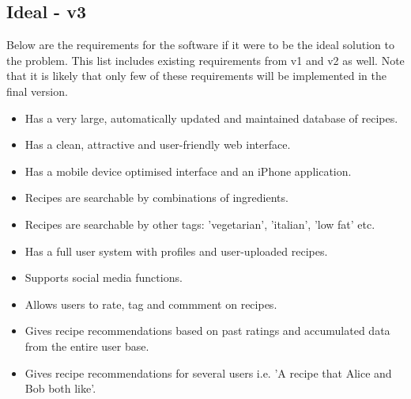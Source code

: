 \subsection{Ideal - v3}

Below are the requirements for the software if it were to be the ideal solution to the problem. This list includes existing requirements from v1 and v2 as well. Note that it is likely that only few of these requirements will be implemented in the final version. 

\begin{itemize}
	\item Has a very large, automatically updated and maintained database of recipes.
	\item Has a clean, attractive and user-friendly web interface.
	\item Has a mobile device optimised interface and an iPhone application.
	\item Recipes are searchable by combinations of ingredients.
	\item Recipes are searchable by other tags: 'vegetarian', 'italian', 'low fat' etc.
	\item Has a full user system with profiles and user-uploaded recipes.
	\item Supports social media functions.
	\item Allows users to rate, tag and commment on recipes.
	\item Gives recipe recommendations based on past ratings and accumulated data from the entire user base.
	\item Gives recipe recommendations for several users i.e. 'A recipe that Alice and Bob both like'.

\end{itemize}
